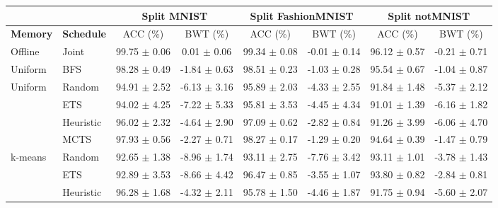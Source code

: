 \begin{tabular}{llcccccc}
	\toprule
	&                 & \multicolumn{2}{c}{\textbf{Split MNIST}} & \multicolumn{2}{c}{\textbf{Split FashionMNIST}} & \multicolumn{2}{c}{\textbf{Split notMNIST}} \\ \midrule
	\textbf{Memory}                 & \textbf{Schedule} & ACC (\%)            & BWT (\%)           & ACC (\%)               & BWT (\%)               & ACC (\%)             & BWT (\%)             \\ \midrule
	Offline                            & Joint           & 99.75 $\pm$ 0.06      & 0.01 $\pm$ 0.06      & 99.34 $\pm$ 0.08         & -0.01 $\pm$ 0.14         & 96.12 $\pm$ 0.57       & -0.21 $\pm$ 0.71       \\ 
	Uniform & BFS & 98.28 $\pm$ 0.49 & -1.84 $\pm$ 0.63 & 98.51 $\pm$ 0.23 & -1.03 $\pm$ 0.28 & 95.54 $\pm$ 0.67 & -1.04 $\pm$ 0.87 \\ \midrule
	\multirow{4}{*}{Uniform}                                   & Random          & 94.91 $\pm$ 2.52      & -6.13 $\pm$ 3.16     & 95.89 $\pm$ 2.03         & -4.33 $\pm$ 2.55         & 91.84 $\pm$ 1.48       & -5.37 $\pm$ 2.12       \\
	& ETS             & 94.02 $\pm$ 4.25      & -7.22 $\pm$ 5.33     & 95.81 $\pm$ 3.53         & -4.45 $\pm$ 4.34         & 91.01 $\pm$ 1.39       & -6.16 $\pm$ 1.82       \\
	& Heuristic         & 96.02 $\pm$ 2.32      & -4.64 $\pm$ 2.90     & 97.09 $\pm$ 0.62         & -2.82 $\pm$ 0.84         & 91.26 $\pm$ 3.99       & -6.06 $\pm$ 4.70       \\
	& MCTS            & 97.93 $\pm$ 0.56      & -2.27 $\pm$ 0.71     & 98.27 $\pm$ 0.17         & -1.29 $\pm$ 0.20         & 94.64 $\pm$ 0.39       & -1.47 $\pm$ 0.79       \\ \midrule
	\multirow{4}{*}{k-means}  & Random          & 92.65 $\pm$ 1.38      & -8.96 $\pm$ 1.74     & 93.11 $\pm$ 2.75         & -7.76 $\pm$ 3.42         & 93.11 $\pm$ 1.01       & -3.78 $\pm$ 1.43       \\
	& ETS             & 92.89 $\pm$ 3.53      & -8.66 $\pm$ 4.42     & 96.47 $\pm$ 0.85         & -3.55 $\pm$ 1.07         & 93.80 $\pm$ 0.82       & -2.84 $\pm$ 0.81       \\
	& Heuristic         & 96.28 $\pm$ 1.68      & -4.32 $\pm$ 2.11     & 95.78 $\pm$ 1.50         & -4.46 $\pm$ 1.87         & 91.75 $\pm$ 0.94       & -5.60 $\pm$ 2.07       \\

\end{tabular}
